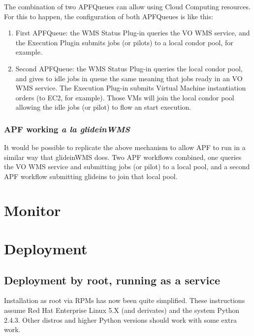 \documentclass[a4paper]{jpconf}
\begin{document}
The combination of two APFQueues can allow using Cloud Computing resources. 
For this to happen, the configuration of both APFQueues is like this:

\begin{enumerate}
\item First APFQueue: 
the WMS Status Plug-in queries the VO WMS service, and the Execution Plugin submits jobs (or pilots) to a local condor pool, for example.
\item Second APFQueue: 
the WMS Status Plug-in queries the local condor pool, 
and gives to idle jobs in queue the same meaning that jobs ready in an VO WMS service. 
The Execution Plug-in submits Virtual Machine instantiation orders (to EC2, for example). 
Those VMs will join the local condor pool allowing the idle jobs (or pilot) to flow an start execution. 
\end{enumerate}

\subsubsection{APF working \emph{a la glideinWMS}}

It would be possible to replicate the above mechanism to allow APF to run in a similar way that glideinWMS does. 
Two APF workflows combined, one queries the VO WMS service and submitting jobs (or pilot) to a local pool, 
and a second APF workflow submitting glideins to join that local pool. 

\section{Monitor}

\section{Deployment}

\subsection{Deployment by root, running as a service}

Installation as root via RPMs has now been quite simplified. 
These instructions assume Red Hat Enterprise Linux 5.X (and derivates) and the system Python 2.4.3. 
Other distros and higher Python versions should work with some extra work.
\end{document}
